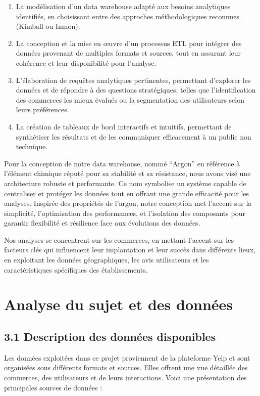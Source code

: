 \begin{enumerate}
\item La modélisation d’un data warehouse adapté aux besoins analytiques identifiés, en choisissant entre des approches méthodologiques reconnues (Kimball ou Inmon).
\item La conception et la mise en œuvre d’un processus ETL pour intégrer des données provenant de multiples formats et sources, tout en assurant leur cohérence et leur disponibilité pour l’analyse.
\item L’élaboration de requêtes analytiques pertinentes, permettant d'explorer les données et de répondre à des questions stratégiques, telles que l’identification des commerces les mieux évalués ou la segmentation des utilisateurs selon leurs préférences.
\item La création de tableaux de bord interactifs et intuitifs, permettant de synthétiser les résultats et de les communiquer efficacement à un public non technique.
\end{enumerate}

Pour la conception de notre data warehouse, nommé “Argon” en référence à l’élément chimique réputé pour sa stabilité et sa résistance, nous avons visé une architecture robuste et performante. Ce nom symbolise un système capable de centraliser et protéger les données tout en offrant une grande efficacité pour les analyses. Inspirée des propriétés de l’argon, notre conception met l’accent sur la simplicité, l’optimisation des performances, et l’isolation des composants pour garantir flexibilité et résilience face aux évolutions des données. 


Nos analyses se concentrent sur les commerces, en mettant l'accent sur les facteurs clés qui influencent leur implantation et leur succès dans différents lieux, en exploitant les données géographiques, les avis utilisateurs et les caractéristiques spécifiques des établissements.


\chapter*{Analyse du sujet et des données}


\section*{3.1 Description des données disponibles}
Les données exploitées dans ce projet proviennent de la plateforme Yelp et sont organisées sous différents formats et sources. Elles offrent une vue détaillée des commerces, des utilisateurs et de leurs interactions. Voici une présentation des principales sources de données :



